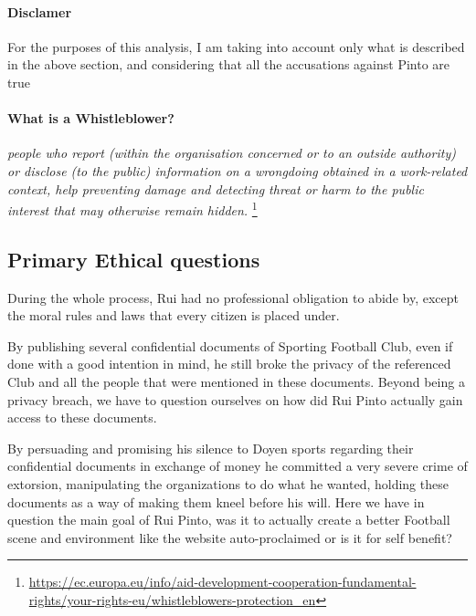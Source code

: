 \paragraph{Disclamer} For the purposes of this analysis, I am taking into account only what is described in the above section, and considering that all the accusations against Pinto are true

\paragraph{What is a Whistleblower?}
\textit{people who report (within the organisation concerned or to an outside authority) or disclose (to the public) information on a wrongdoing obtained in a work-related context, help preventing damage and detecting threat or harm to the public interest that may otherwise remain hidden.}
\footnote{\url{https://ec.europa.eu/info/aid-development-cooperation-fundamental-rights/your-rights-eu/whistleblowers-protection_en}}




\subsection{Primary Ethical questions}
During the whole process, Rui had no professional obligation to abide by, except the moral rules and laws that every citizen is placed under.

By publishing several confidential documents of Sporting Football Club, even if done with a good intention in mind, he still broke the privacy of the referenced Club and all the people that were mentioned in these documents.
Beyond being a privacy breach, we have to question ourselves on how did Rui Pinto actually gain access to these documents.

By persuading and promising his silence to Doyen sports regarding their confidential documents in exchange of money he committed a very severe crime of extorsion, manipulating the organizations to do what he wanted, holding these documents as a way of making them kneel before his will.
Here we have in question the main goal of Rui Pinto, was it to actually create a better Football scene and environment like the website auto-proclaimed or is it for self benefit?


